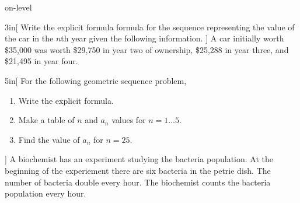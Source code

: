 \begin{taggedblock}{on-level}

\begin{myWideProblem}{3in}[%
        Write the explicit formula formula
        for the sequence representing the value of the car in the $n$th year
        given the following information.
    ]
    {
        A car initially worth \$35,000 
        was worth \$29,750 in year two of ownership, 
        \$25,288 in year three,
        and \$21,495 in year four. 
    }
\end{myWideProblem}

\newpage
\begin{myWideProblem}{5in}[%
    For the following geometric sequence problem,
    \begin{enumerate}[nosep,topsep=-0.5\onelineskip]
        \item Write the explicit formula.
        \item Make a table of $n$ and $a_n$ values for $n=1\dots5$.
        \item Find the value of $a_n$ for $n=25$.
    \end{enumerate}
]
{
    A biochemist has an experiment studying the bacteria population. 
    At the beginning of the experiement there are six bacteria in the petrie dish.
    The number of bacteria double every hour.
    The biochemist counts the bacteria population every hour.
}
\end{myWideProblem}

\end{taggedblock}